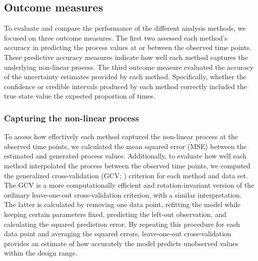 \documentclass[man, floatsintext]{apa7}
\begin{document}
\subsection{Outcome measures}

To evaluate and compare the performance of the different analysis methods, we
focused on three outcome measures. The first two assessed each method's
accuracy in predicting the process values at or between the observed time
points. These predictive accuracy measures indicate how well each method
captures the underlying non-linear process. The third outcome measure evaluated
the accuracy of the uncertainty estimates provided by each method.
Specifically, whether the confidence or credible intervals produced
by each method correctly included the true state value the expected proportion
of times.

\subsubsection{Capturing the non-linear process}

To assess how effectively each method captured the non-linear process at the
observed time points, we calculated the mean squared error (MSE) between the
estimated and generated process values. Additionally,
to evaluate how well each method
interpolated the process between the observed time points, we computed the
generalized cross-validation (GCV; \textcite{golub_generalized_1979}) criterion
for each method and data set. The GCV is a more computationally efficient and
rotation-invariant version of the ordinary leave-one-out cross-validation
criterion, with a similar interpretation. The latter is calculated by removing
one data point, refitting the
model while keeping certain parameters fixed, predicting the left-out
observation, and calculating the squared
prediction error. By repeating this procedure for each data point and averaging
the squared errors, leave-one-out cross-validation provides an estimate of
how accurately the model
predicts unobserved values within the design range.

\end{document}
